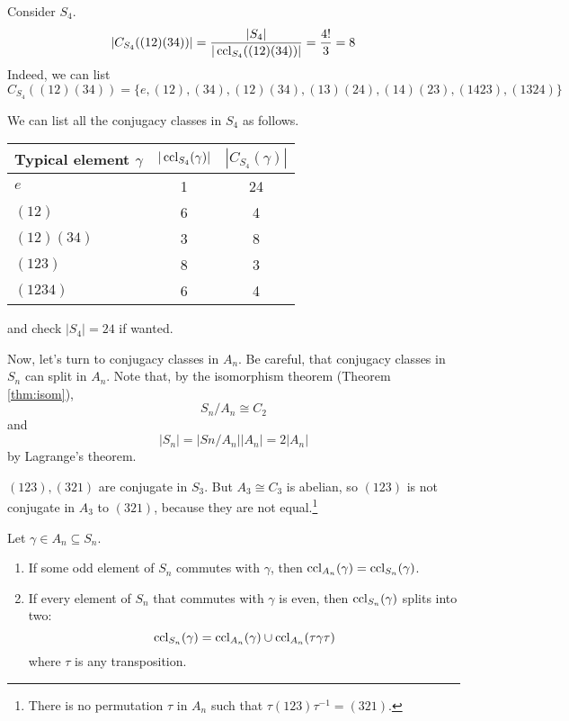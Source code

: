 \documentclass[10pt, a4paper, twoside]{report}
\begin{document}
\begin{example} Consider \(S_4\).
    \[|C_{S_4}((12)(34))|=\frac{|S_4|}{|\operatorname{ccl}_{S_4}((12)(34))|}=\frac{4!}{3}=8\]
    Indeed, we can list 
    \[C_{S_4}((12)(34))=\{e,(12),(34),(12)(34),(13)(24),(14)(23),(1423),(1324)\}\]
\end{example}
\begin{example}
    We can list all the conjugacy classes in \(S_4\) as follows.
    \begin{table}[H]
        \centering
        \begin{tabularx}{0.6\textwidth}{Xcc}
            \toprule
            Typical element \(\gamma\) & \(|\operatorname{ccl}_{S_4}(\gamma)|\) & \(|C_{S_4}(\gamma)|\) \\
            \midrule
            \(e\) & 1 & 24 \\
            \((12)\) & 6 & 4 \\
            \((12)(34)\) & 3 & 8 \\
            \((123)\) & 8 & 3 \\
            \((1234)\) & 6 & 4 \\
            \bottomrule 
        \end{tabularx}
    \end{table}
    and check \(|S_4|=24\) if wanted.
    \label{eg:conj_s4}
\end{example}
Now, let's turn to conjugacy classes in \(A_n\). Be careful, that conjugacy classes in \(S_n\) can split in \(A_n\). Note that, by the isomorphism theorem (Theorem \ref{thm:isom}), 
\[S_n/A_n\cong C_2\]
and 
\[|S_n|=|Sn/A_n||A_n|=2|A_n|\]
by Lagrange's theorem.
\begin{example}
    \((123),(321)\) are conjugate in \(S_3\). But \(A_3\cong C_3\) is abelian, so \((123)\) is not conjugate in \(A_3\) to \((321)\), because they are not equal.\footnote{There is no permutation \(\tau\) in \(A_n\) such that \(\tau(123)\tau^{-1}=(321)\).}
\end{example}
\begin{lemma}
    Let \(\gamma\in A_n\subseteq S_n\).
    \begin{enumerate}
        \item If some odd element of \(S_n\) commutes with \(\gamma\), then \(\operatorname{ccl}_{A_n}(\gamma)=\operatorname{ccl}_{S_n}(\gamma)\).
        \item If every element of \(S_n\) that commutes with \(\gamma\) is even, then \(\operatorname{ccl}_{S_n}(\gamma)\) splits into two:
        \[\operatorname{ccl}_{S_n}(\gamma)=\operatorname{ccl}_{A_n}(\gamma)\cup\operatorname{ccl}_{A_n}(\tau\gamma\tau)\]
        where \(\tau\) is any transposition.
    \end{enumerate}
\end{lemma}
\end{document}

